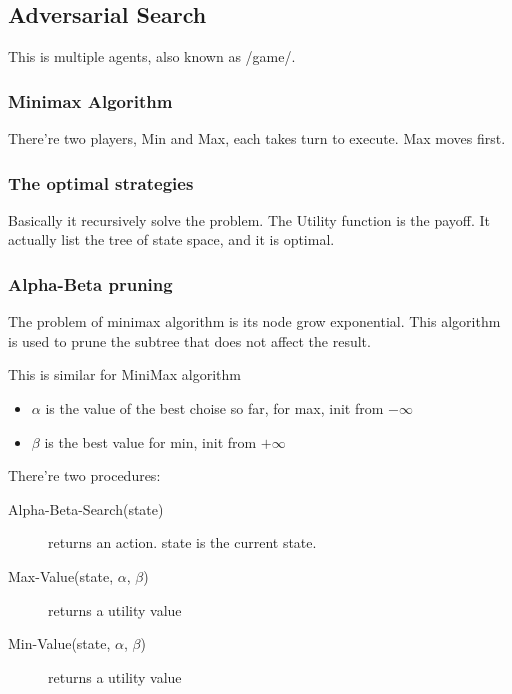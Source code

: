 \subsection{Adversarial Search}

This is multiple agents, also known as /game/.

\subsubsection{Minimax Algorithm}
There're two players, Min and Max, each takes turn to execute.  Max
moves first.

\subsubsection{The optimal strategies}


Basically it recursively solve the problem.  The Utility function is
the payoff.  It actually list the tree of state space, and it is
optimal.

\subsubsection{Alpha-Beta pruning}
The problem of minimax algorithm is its node grow exponential.  This
algorithm is used to prune the subtree that does not affect the
result.

This is similar for MiniMax algorithm
\begin{itemize}
\item $\alpha$ is the value of the best choise so far, for max, init
  from $-\infty$
\item $\beta$ is the best value for min, init from $+\infty$
\end{itemize}

There're two procedures:
\begin{description}
\item [Alpha-Beta-Search(state)] returns an action. state is the current state.
\item [Max-Value(state, $\alpha$, $\beta$)] returns a utility value
\item [Min-Value(state, $\alpha$, $\beta$)] returns a utility value
\end{description}

